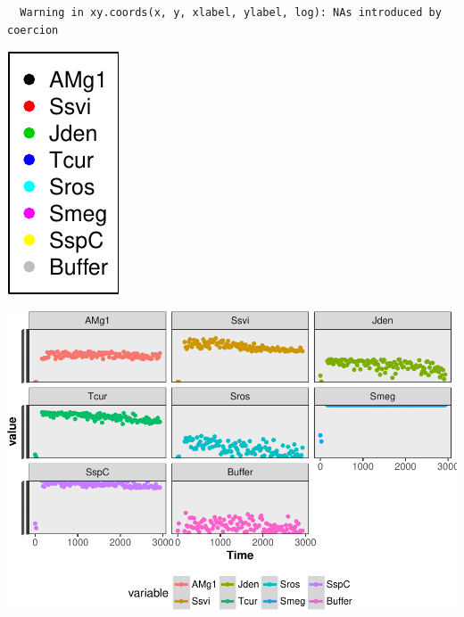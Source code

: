 \documentclass[12pt,twoside]{reedthesis}
\begin{document}
  \begin{verbatim}
  Warning in xy.coords(x, y, xlabel, ylabel, log): NAs introduced by coercion
  \end{verbatim}
  
  \begin{center}\includegraphics{tesis_files/figure-latex/activity-1} \end{center}
  
  \begin{Shaded}
  \begin{Highlighting}[]
  \NormalTok{()}
  \NormalTok{(}\NormalTok{, }  \NormalTok{)}
  \end{Highlighting}
  \end{Shaded}
  
  \begin{center}\includegraphics{tesis_files/figure-latex/activity-2} \end{center}
  
\end{document}
